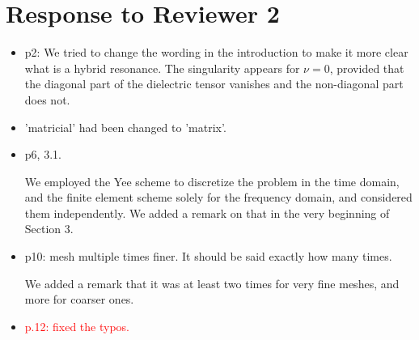 \documentclass[a4paper,10pt]{article}
\begin{document}
\section{Response to  Reviewer 2}
 \begin{itemize}
\item p2:  We tried to change the wording in the introduction to make it more clear what is a hybrid resonance. 
The singularity appears for $\nu=0$, provided that the diagonal part of the dielectric tensor vanishes and the non-diagonal part does not. 

\item 'matricial' had been changed to 'matrix'.

\item p6, 3.1. 

We employed the Yee scheme to discretize the problem in the time domain, and the finite element scheme solely for the frequency domain, 
and considered them independently. We added a remark on that in the very beginning of Section 3. 

\item p10: mesh multiple times finer. It should be said exactly how many times. 

We added a remark that it was at least two times for very fine meshes, and more for coarser ones.

\item {\textcolor{red}{p.12: fixed the typos.}}
\end{itemize}

  
 
\end{document}
